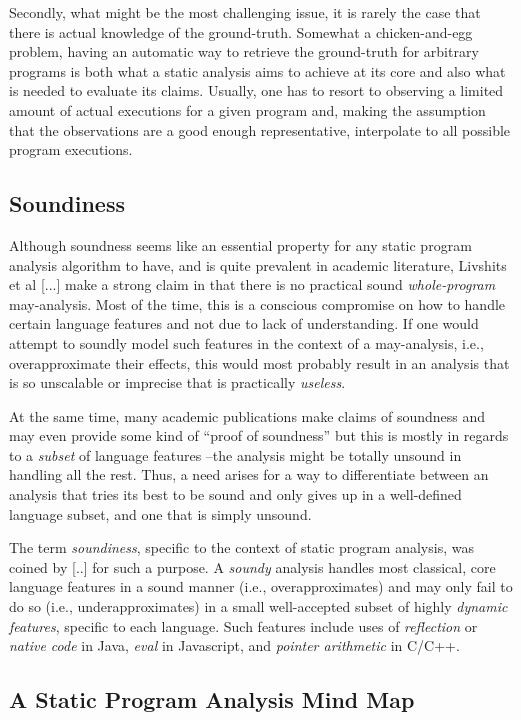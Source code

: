 Secondly, what might be the most challenging issue, it is rarely the case that
there is actual knowledge of the ground-truth. Somewhat a chicken-and-egg
problem, having an automatic way to retrieve the ground-truth for arbitrary
programs is both what a static analysis aims to achieve at its core and also
what is needed to evaluate its claims. Usually, one has to resort to observing
a limited amount of actual executions for a given program and, making the
assumption that the observations are a good enough representative, interpolate
to all possible program executions.

\subsection{Soundiness}

Although soundness seems like an essential property for any static program
analysis algorithm to have, and is quite prevalent in academic literature,
Livshits et al [...] make a strong claim in that there is no practical sound
\emph{whole-program} may-analysis. Most of the time, this is a conscious
compromise on how to handle certain language features and not due to lack of
understanding. If one would attempt to soundly model such features in the
context of a may-analysis, i.e., overapproximate their effects, this would most
probably result in an analysis that is so unscalable or imprecise that is
practically \emph{useless}.

At the same time, many academic publications make claims of soundness and may
even provide some kind of ``proof of soundness'' but this is mostly in regards
to a \emph{subset} of language features --the analysis might be totally unsound
in handling all the rest. Thus, a need arises for a way to differentiate
between an analysis that tries its best to be sound and only gives up in a
well-defined language subset, and one that is simply unsound.

The term \emph{soundiness}, specific to the context of static program analysis,
was coined by [..] for such a purpose. A \emph{soundy} analysis handles most
classical, core language features in a sound manner (i.e., overapproximates)
and may only fail to do so (i.e., underapproximates) in a small well-accepted
subset of highly \emph{dynamic features}, specific to each language. Such
features include uses of \emph{reflection} or \emph{native code} in Java,
\emph{eval} in Javascript, and \emph{pointer arithmetic} in C/C++.

\subsection{A Static Program Analysis Mind Map}

